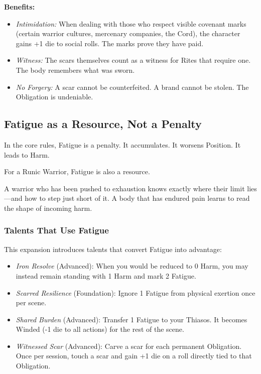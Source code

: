 \textbf{Benefits:}
\begin{itemize}
\item \textit{Intimidation:} When dealing with those who respect visible covenant marks (certain warrior cultures, mercenary companies, the Cord), the character gains +1 die to social rolls. The marks prove they have paid.
\item \textit{Witness:} The scars themselves count as a witness for Rites that require one. The body remembers what was sworn.
\item \textit{No Forgery:} A scar cannot be counterfeited. A brand cannot be stolen. The Obligation is undeniable.
\end{itemize}

\subsection{Fatigue as a Resource, Not a Penalty}

In the core rules, Fatigue is a penalty. It accumulates. It worsens Position. It leads to Harm.

For a Runic Warrior, Fatigue is also a resource.

A warrior who has been pushed to exhaustion knows exactly where their limit lies—and how to step just short of it. A body that has endured pain learns to read the shape of incoming harm.

\subsubsection{Talents That Use Fatigue}

This expansion introduces talents that convert Fatigue into advantage:

\begin{itemize}
\item \textit{Iron Resolve} (Advanced): When you would be reduced to 0 Harm, you may instead remain standing with 1 Harm and mark 2 Fatigue.
\item \textit{Scarred Resilience} (Foundation): Ignore 1 Fatigue from physical exertion once per scene.
\item \textit{Shared Burden} (Advanced): Transfer 1 Fatigue to your Thiasos. It becomes Winded (-1 die to all actions) for the rest of the scene.
\item \textit{Witnessed Scar} (Advanced): Carve a scar for each permanent Obligation. Once per session, touch a scar and gain +1 die on a roll directly tied to that Obligation.
\end{itemize}

